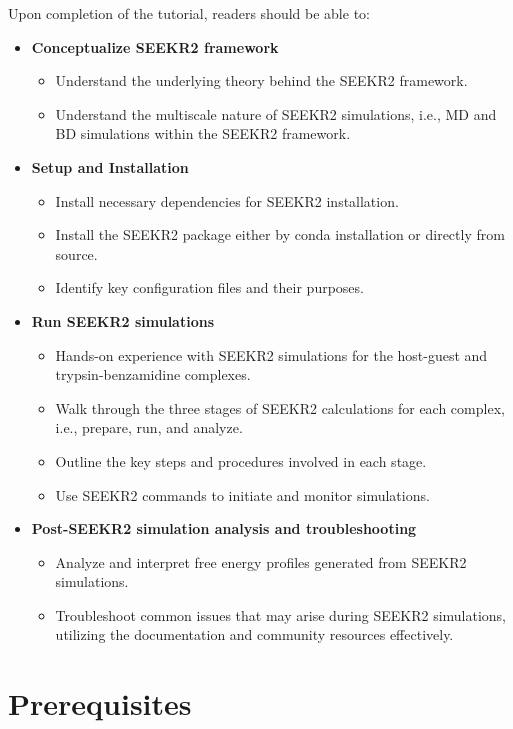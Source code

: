 \documentclass[9pt,training,pubversion]{livecoms}
\begin{document}
Upon completion of the tutorial, readers should be able to:
\begin{itemize}

\item \textbf{Conceptualize SEEKR2 framework}
\begin{itemize}
\item Understand the underlying theory behind the SEEKR2 framework.
\item Understand the multiscale nature of SEEKR2 simulations, i.e.,  MD and BD simulations within the SEEKR2 framework.
\end{itemize}

\item \textbf{Setup and Installation}
\begin{itemize}
\item Install necessary dependencies for SEEKR2 installation.
\item Install the SEEKR2 package either by conda installation or directly from source.
\item Identify key configuration files and their purposes.
\end{itemize}

\item \textbf{Run SEEKR2 simulations}
\begin{itemize}
\item Hands-on experience with SEEKR2 simulations for the host-guest and trypsin-benzamidine complexes.
\item Walk through the three stages of SEEKR2 calculations for each complex, i.e., prepare, run, and analyze.
\item Outline the key steps and procedures involved in each stage.
\item Use SEEKR2 commands to initiate and monitor simulations.
\end{itemize}

\item \textbf{Post-SEEKR2 simulation analysis and troubleshooting}
\begin{itemize} 
\item Analyze and interpret free energy profiles generated from SEEKR2 simulations.
\item Troubleshoot common issues that may arise during SEEKR2 simulations, utilizing the documentation and community resources effectively.
\end{itemize}
\end{itemize}


\section{Prerequisites}
\vspace{2mm}
\end{document}
